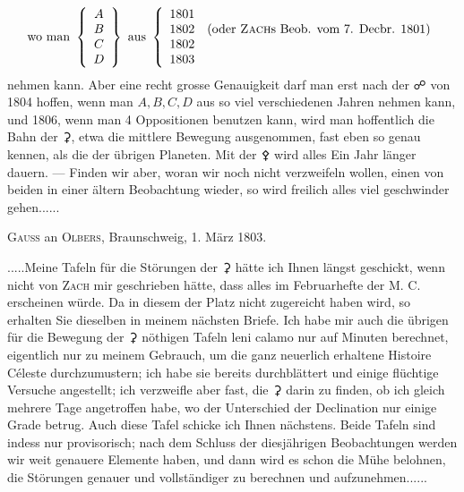 \[\textstyle
\text{wo man }\left\{\begin{array}{c}A\\B\\C\\D\end{array}\right\}
\text{ aus }\left\{\begin{array}{ll}
1801&\\
1802&\text{(oder \textsc{Zach}s Beob. vom 7. Decbr. 1801)}\\
1802&\\
1803&
\end{array}\right.
\]
nehmen kann. Aber eine recht grosse Genauigkeit darf man erst nach der {\AstroSymbols ☍} von 1804 hoffen, wenn man \(A,B,C,D\) aus so viel verschiedenen Jahren nehmen kann, und 1806, wenn man 4 Oppositionen benutzen kann, wird man hoffentlich die Bahn der {\AstroSymbols ⚳}, etwa die mittlere Bewegung ausgenommen, fast eben so genau kennen, als die der übrigen Planeten. Mit der {\AstroSymbols ⚴} wird alles Ein Jahr länger dauern. — Finden wir aber, woran wir noch nicht verzweifeln wollen, einen von beiden in einer ältern Beobachtung wieder, so wird freilich alles viel geschwinder gehen.\quad.\quad.\quad.\quad.\quad.

\begin{center}
\textsc{Gauss} an \textsc{Olbers}, Braunschweig, 1. März 1803.
\end{center}
\noindent\hspace*{\parindent}.\quad.\quad.\quad.\quad.\quad Meine Tafeln für die Störungen der {\AstroSymbols ⚳} hätte ich Ihnen längst geschickt, wenn nicht von \textsc{Zach} mir geschrieben hätte, dass alles im Februarhefte der M. C. erscheinen würde. Da in diesem der Platz nicht zugereicht haben wird, so erhalten Sie dieselben in meinem nächsten Briefe. Ich habe mir auch die übrigen für die Bewegung der {\AstroSymbols ⚳} nöthigen Tafeln leni calamo nur auf Minuten berechnet, eigentlich nur zu meinem Gebrauch, um die ganz neuerlich erhaltene Histoire Céleste durchzumustern; ich habe sie bereits durchblättert und einige flüchtige Versuche angestellt; ich verzweifle aber fast, die {\AstroSymbols ⚳} darin zu finden, ob ich gleich mehrere Tage angetroffen habe, wo der Unterschied der Declination nur einige Grade betrug. Auch diese Tafel schicke ich Ihnen nächstens. Beide Tafeln sind indess nur provisorisch; nach dem Schluss der diesjährigen Beobachtungen werden wir weit genauere Elemente haben, und dann wird es schon die Mühe belohnen, die Störungen genauer und vollständiger zu berechnen und aufzunehmen.\quad.\quad.\quad.\quad.\quad.

